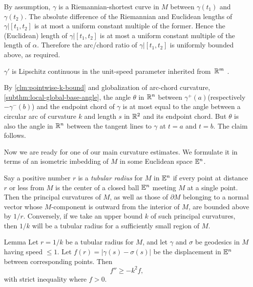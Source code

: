 By assumption, $\gamma$ is a Riemannian-shortest curve in $M$ between $\gamma(t_1)$ and $\gamma(t_2)$. The absolute difference of the Riemannian and Euclidean lengths of $\gamma|[t_1,t_2]$ 
 is at most a uniform constant multiple of the former. Hence the (Euclidean) length of $\gamma|[t_1,t_2]$
  is at most a uniform constant  multiple of the length of $\alpha$.   Therefore the arc/chord ratio of $\gamma|[t_1,t_2]$ is uniformly bounded above, as required.

\begin{clm}{}\label{clm:global-k-bound}$\gamma'$ is Lipschitz continuous in the unit-speed parameter inherited from $\,\mathbb{R}^m$ . 
\end{clm}
By \ref{clm:pointwise-k-bound} and globalization of arc-chord curvature, 
\ref{subthm:local-global-base-angle}, the angle $\theta$ in $\mathbb{R}^n$ between $\gamma^+(a)$(respectively $-\gamma^-(b)$)  and the endpoint chord of $\gamma$ is at most equal to the angle between a circular arc of curvature $k$ and length $s$  in $\mathbb{R}^2$ and  its endpoint chord.  But $\theta$ is also the angle in $\mathbb{R}^n$ between the tangent lines to $\gamma$ at $t=a$ and $t=b$.  The claim follows.
\qeds

Now we are ready for one of our main curvature estimates. We formulate it in terms of an 
isometric imbedding of $M$ in some Euclidean space $\mathbb{E}^n$. 

Say a positive number $r$ is a \emph{tubular
radius} for $M$ in $\mathbb{E}^n$ if every point at distance $r$ or less from $M$ is the center of a
closed ball $\mathbb{E}^n$ meeting $M$ at a single point. Then the principal curvatures of $M$, as well as  those of $\partial M$ belonging to a normal
vector whose $M$-component is outward from the interior of $M$, are bounded
above by $1/r$. Conversely, if we take an upper bound $k$ of such principal
curvatures, then
$1/k$ will be a tubular radius for a sufficiently small region of $M$.


\begin{thm}{Lemma}\label{lem:diff-inequality} Let $r = 1/k$ be a tubular radius for $M$, and let $\gamma$ and $\sigma$ be
geodesics in $M$ having speed $\le 1$. Let $f(r) = |\gamma(s) - \sigma(s)|$ be the
displacement in $\mathbb{E}^n$ between corresponding points. Then 
$$f'' \ge -k^2f,$$ with strict inequality where $f> 0$.
\end{thm}


